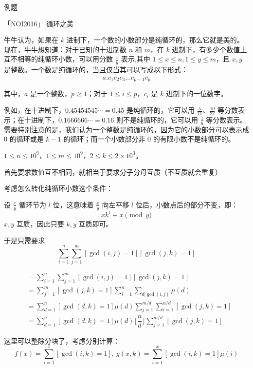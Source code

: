 \documentclass[UTF8]{beamer}
\begin{document}
    \begin{frame}{例题}
        \begin{block}{「NOI2016」 循环之美}
    
   牛牛认为，如果在 $k$ 进制下，一个数的小数部分是纯循环的，那么它就是美的。现在，牛牛想知道：对于已知的十进制数 $n$ 和 $m$，在 $k$ 进制下，有多少个数值上互不相等的纯循环小数，可以用分数 $\frac xy$ 表示,其中 $1\le x\le n,1\le y\le m$，且 $x,y$ 是整数。一个数是纯循环的，当且仅当其可以写成以下形式：
    $$a.\dot{c_1} c_2 c_3 \dots c_{p - 1} \dot{c_p}$$
    
    其中，$a$ 是一个整数，$p\ge 1$；对于 $1\le i\le p$，$c_i$ 是 $k$ 进制下的一位数字。
    
    例如，在十进制下，$0.45454545\cdots=0.\dot {4} \dot {5}$ 是纯循环的，它可以用 $\frac {5}{11}$、$\frac{10}{22}$ 等分数表示；在十进制下，$0.1666666\cdots=0.1\dot6$ 则不是纯循环的，它可以用 $\frac 16$ 等分数表示。需要特别注意的是，我们认为一个整数是纯循环的，因为它的小数部分可以表示成 $0$ 的循环或是 $k-1$ 的循环；而一个小数部分非 $0$ 的有限小数不是纯循环的。
     
    $1\leq n\leq 10^9$，$1\leq m \leq 10^9$，$2\leq k \leq 2\times 10^3 $。
    
        \end{block}
    \end{frame}
    \begin{frame}
        
    首先要求数值互不相同，就相当于要求分子分母互质（不互质就会重复）
    
    考虑怎么转化纯循环小数这个条件：
    
    设 $\frac{x}{y}$ 循环节为 $l$ 位，这意味着 $\frac{x}{y}$ 向左平移 $l$ 位后，小数点后的部分不变，即：
    $$
    xk^l\equiv x\pmod y
    $$
    $x,y$ 互质，因此只要 $k,y$ 互质即可。
    
    于是只需要求
    $$
    \sum_{i=1}^{n}\sum_{j=1}^{m}[\gcd(i,j)=1][\gcd(j,k)=1]
    $$
    \end{frame}
    
    \begin{frame}
    $$
    \begin{aligned}
    &=\sum_{i=1}^{n}\sum_{j=1}^{m}[\gcd(i,j)=1][\gcd(j,k)=1]\\
    &=\sum_{j=1}^{m}[\gcd(j,k)=1]\sum_{i=1}^{n}\sum_{d|\gcd(i,j)}\mu(d)\\
    &=\sum_{d=1}^{n}[\gcd(d,k)=1]\mu(d)\sum_{j=1}^{m/d}\sum_{i=1}^{n/d}[\gcd(j,k)=1]\\
    &=\sum_{d=1}^{n}[\gcd(d,k)=1]\mu(d)\lfloor\dfrac{n}{d}\rfloor\sum_{j=1}^{m/d}[\gcd(j,k)=1]
    \end{aligned}
    $$
    
    
    这里可以整除分块了，考虑分别计算：
    $$
    f(x)=\sum_{i=1}^{x}[\gcd(i,k)=1],\ g(x,k)=\sum_{i=1}^{x}[\gcd(i,k)=1]\mu(i)
    $$
    
    \end{frame}
    
\end{document}
